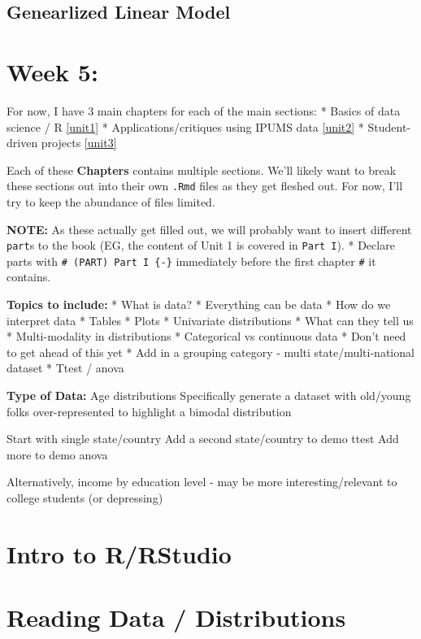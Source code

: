 \documentclass[
]{book}
\begin{document}
\hypertarget{genearlized-linear-model}{%
\subsection{Genearlized Linear Model}\label{genearlized-linear-model}}

\hypertarget{week-5}{%
\section{Week 5:}\label{week-5}}

For now, I have 3 main chapters for each of the main sections:
* Basics of data science / R \ref{unit1}
* Applications/critiques using IPUMS data \ref{unit2}
* Student-driven projects \ref{unit3}

Each of these \textbf{Chapters} contains multiple sections. We'll likely want to break these sections out into their own \texttt{.Rmd} files as they get fleshed out. For now, I'll try to keep the abundance of files limited.

\textbf{NOTE:} As these actually get filled out, we will probably want to insert different \texttt{part}s to the book (EG, the content of Unit 1 is covered in \texttt{Part\ I}).
* Declare parts with \texttt{\#\ (PART)\ Part\ I\ \{-\}} immediately before the first chapter \texttt{\#} it contains.

\textbf{Topics to include:}
* What is data?
* Everything can be data
* How do we interpret data
* Tables
* Plots
* Univariate distributions
* What can they tell us
* Multi-modality in distributions
* Categorical vs continuous data
* Don't need to get ahead of this yet
* Add in a grouping category - multi state/multi-national dataset
* Ttest / anova

\textbf{Type of Data:}
Age distributions
Specifically generate a dataset with old/young folks over-represented to highlight a bimodal distribution

Start with single state/country
Add a second state/country to demo ttest
Add more to demo anova

Alternatively, income by education level - may be more interesting/relevant to college students (or depressing)

\hypertarget{intro-to-rrstudio}{%
\section{Intro to R/RStudio}\label{intro-to-rrstudio}}

\hypertarget{reading-data-distributions}{%
\section{Reading Data / Distributions}\label{reading-data-distributions}}
\end{document}
